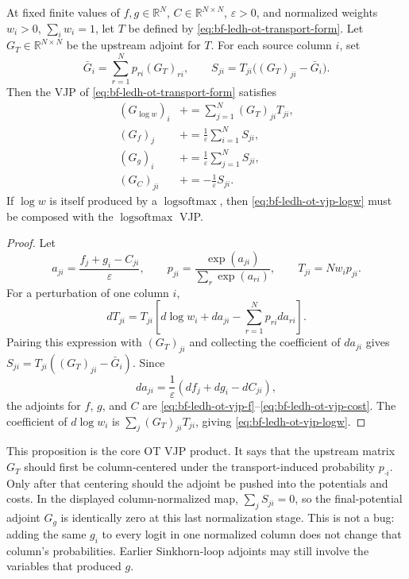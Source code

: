 \begin{proposition}
\label{prop:bf-ledh-ot-normalized-transport-vjp}
At fixed finite values of \(f,g\in\mathbb R^N\),
\(C\in\mathbb R^{N\times N}\), \(\varepsilon>0\), and normalized weights
\(w_i>0\), \(\sum_i w_i=1\), let \(T\) be defined by
\eqref{eq:bf-ledh-ot-transport-form}.  Let
\(G_T\in\mathbb R^{N\times N}\) be the upstream adjoint for \(T\).  For each
source column \(i\), set
\begin{equation}
\label{eq:bf-ledh-ot-column-mean-adjoint}
  \bar G_i=\sum_{r=1}^N p_{ri}(G_T)_{ri},
  \qquad
  S_{ji}=T_{ji}\bigl((G_T)_{ji}-\bar G_i\bigr).
\end{equation}
Then the VJP of \eqref{eq:bf-ledh-ot-transport-form} satisfies
\begin{align}
\label{eq:bf-ledh-ot-vjp-logw}
  (G_{\log w})_i
  &\mathrel{+}=
  \sum_{j=1}^N (G_T)_{ji}T_{ji},\\
\label{eq:bf-ledh-ot-vjp-f}
  (G_f)_j
  &\mathrel{+}=
  \frac{1}{\varepsilon}\sum_{i=1}^N S_{ji},\\
\label{eq:bf-ledh-ot-vjp-g}
  (G_g)_i
  &\mathrel{+}=
  \frac{1}{\varepsilon}\sum_{j=1}^N S_{ji},\\
\label{eq:bf-ledh-ot-vjp-cost}
  (G_C)_{ji}
  &\mathrel{+}=
  -\frac{1}{\varepsilon}S_{ji}.
\end{align}
If \(\log w\) is itself produced by a \(\operatorname{logsoftmax}\), then
\eqref{eq:bf-ledh-ot-vjp-logw} must be composed with the
\(\operatorname{logsoftmax}\) VJP.
\end{proposition}

\begin{proof}
Let
\[
  a_{ji}=\frac{f_j+g_i-C_{ji}}{\varepsilon},
  \qquad
  p_{ji}=\frac{\exp(a_{ji})}{\sum_r\exp(a_{ri})},
  \qquad
  T_{ji}=Nw_i p_{ji}.
\]
For a perturbation of one column \(i\),
\[
  dT_{ji}
  =
  T_{ji}
  \left[
    d\log w_i
    + da_{ji}
    - \sum_{r=1}^N p_{ri}da_{ri}
  \right].
\]
Pairing this expression with \((G_T)_{ji}\) and collecting the coefficient of
\(da_{ji}\) gives \(S_{ji}=T_{ji}((G_T)_{ji}-\bar G_i)\).  Since
\[
  da_{ji}
  =
  \frac{1}{\varepsilon}
  (df_j+dg_i-dC_{ji}),
\]
the adjoints for \(f\), \(g\), and \(C\) are
\eqref{eq:bf-ledh-ot-vjp-f}--\eqref{eq:bf-ledh-ot-vjp-cost}.  The coefficient
of \(d\log w_i\) is \(\sum_j (G_T)_{ji}T_{ji}\), giving
\eqref{eq:bf-ledh-ot-vjp-logw}.
\end{proof}

This proposition is the core OT VJP product.  It says that the upstream matrix
\(G_T\) should first be column-centered under the transport-induced probability
\(p_{\cdot i}\).  Only after that centering should the adjoint be pushed into
the potentials and costs.  In the displayed column-normalized map,
\(\sum_j S_{ji}=0\), so the final-potential adjoint \(G_g\) is identically zero
at this last normalization stage.  This is not a bug: adding the same \(g_i\)
to every logit in one normalized column does not change that column's
probabilities.  Earlier Sinkhorn-loop adjoints may still involve the variables
that produced \(g\).

